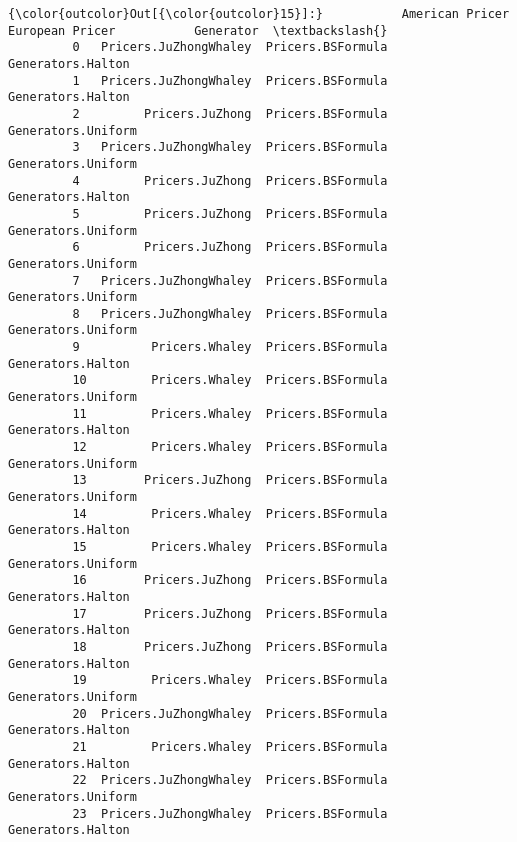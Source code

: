 \documentclass[11pt]{article}
\begin{document}
\begin{Verbatim}[commandchars=\\\{\}]
{\color{outcolor}Out[{\color{outcolor}15}]:}           American Pricer    European Pricer           Generator  \textbackslash{}
         0   Pricers.JuZhongWhaley  Pricers.BSFormula   Generators.Halton   
         1   Pricers.JuZhongWhaley  Pricers.BSFormula   Generators.Halton   
         2         Pricers.JuZhong  Pricers.BSFormula  Generators.Uniform   
         3   Pricers.JuZhongWhaley  Pricers.BSFormula  Generators.Uniform   
         4         Pricers.JuZhong  Pricers.BSFormula   Generators.Halton   
         5         Pricers.JuZhong  Pricers.BSFormula  Generators.Uniform   
         6         Pricers.JuZhong  Pricers.BSFormula  Generators.Uniform   
         7   Pricers.JuZhongWhaley  Pricers.BSFormula  Generators.Uniform   
         8   Pricers.JuZhongWhaley  Pricers.BSFormula  Generators.Uniform   
         9          Pricers.Whaley  Pricers.BSFormula   Generators.Halton   
         10         Pricers.Whaley  Pricers.BSFormula  Generators.Uniform   
         11         Pricers.Whaley  Pricers.BSFormula   Generators.Halton   
         12         Pricers.Whaley  Pricers.BSFormula  Generators.Uniform   
         13        Pricers.JuZhong  Pricers.BSFormula  Generators.Uniform   
         14         Pricers.Whaley  Pricers.BSFormula   Generators.Halton   
         15         Pricers.Whaley  Pricers.BSFormula  Generators.Uniform   
         16        Pricers.JuZhong  Pricers.BSFormula   Generators.Halton   
         17        Pricers.JuZhong  Pricers.BSFormula   Generators.Halton   
         18        Pricers.JuZhong  Pricers.BSFormula   Generators.Halton   
         19         Pricers.Whaley  Pricers.BSFormula  Generators.Uniform   
         20  Pricers.JuZhongWhaley  Pricers.BSFormula   Generators.Halton   
         21         Pricers.Whaley  Pricers.BSFormula   Generators.Halton   
         22  Pricers.JuZhongWhaley  Pricers.BSFormula  Generators.Uniform   
         23  Pricers.JuZhongWhaley  Pricers.BSFormula   Generators.Halton   
         

\end{Verbatim}
\end{document}
